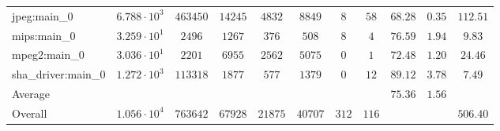 \begin{tabular}{|l|c|c|c|c|c|c|c|c|c|c|}
jpeg:main\_0            & $ 6.788 \cdot 10^{3} $ & $ 463450 $ & $ 14245 $ & $ 4832  $ & $ 8849  $ & $ 8   $ & $ 58  $ & $ 68.28       $ & $ 0.35    $ & $ 112.51  $ \\
mips:main\_0            & $ 3.259 \cdot 10^{1} $ & $ 2496   $ & $ 1267  $ & $ 376   $ & $ 508   $ & $ 8   $ & $ 4   $ & $ 76.59       $ & $ 1.94    $ & $ 9.83    $ \\
mpeg2:main\_0           & $ 3.036 \cdot 10^{1} $ & $ 2201   $ & $ 6955  $ & $ 2562  $ & $ 5075  $ & $ 0   $ & $ 1   $ & $ 72.48       $ & $ 1.20    $ & $ 24.46   $ \\
sha\_driver:main\_0     & $ 1.272 \cdot 10^{3} $ & $ 113318 $ & $ 1877  $ & $ 577   $ & $ 1379  $ & $ 0   $ & $ 12  $ & $ 89.12       $ & $ 3.78    $ & $ 7.49    $ \\
\hline
Average                 & $                    $ & $        $ & $       $ & $       $ & $       $ & $     $ & $     $ & $ 75.36       $ & $ 1.56    $ & $         $ \\
\hline
Overall                 & $ 1.056 \cdot 10^{4} $ & $ 763642 $ & $ 67928 $ & $ 21875 $ & $ 40707 $ & $ 312 $ & $ 116 $ & $             $ & $         $ & $ 506.40  $ \\
\hline
\end{tabular}
